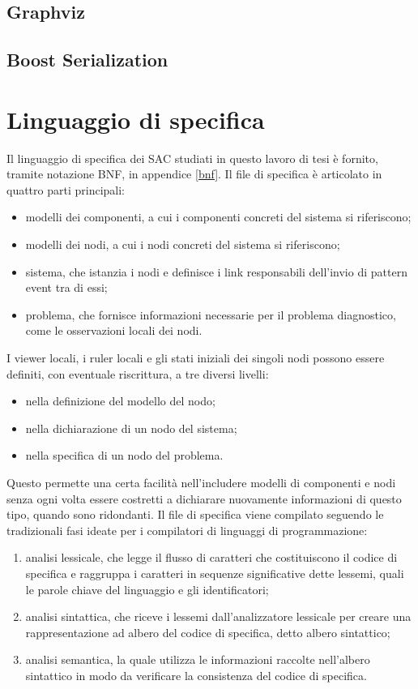\subsection{Graphviz}

\subsection{Boost Serialization}




\section{Linguaggio di specifica}
Il linguaggio di specifica dei SAC studiati in questo lavoro di tesi è fornito, tramite notazione BNF, in appendice \ref{bnf}. 
Il file di specifica è articolato in quattro parti principali:
\begin{itemize}
\item modelli dei componenti, a cui i componenti concreti del sistema si riferiscono;
\item modelli dei nodi, a cui i nodi concreti del sistema si riferiscono;
\item sistema, che istanzia i nodi e definisce i link responsabili dell'invio di pattern event tra di essi;
\item problema, che fornisce informazioni necessarie per il problema diagnostico, come le osservazioni locali dei nodi.
\end{itemize}
I viewer locali, i ruler locali e gli stati iniziali dei singoli nodi possono essere definiti, con eventuale riscrittura, a tre diversi livelli:
\begin{itemize}
\item nella definizione del modello del nodo;
\item nella dichiarazione di un nodo del sistema;
\item nella specifica di un nodo del problema.
\end{itemize}
Questo permette una certa facilità nell'includere modelli di componenti e nodi senza ogni volta essere costretti a dichiarare nuovamente informazioni di questo tipo, quando sono ridondanti.
Il file di specifica viene compilato seguendo le tradizionali fasi ideate per i compilatori di linguaggi di programmazione:
\begin{enumerate}
\item analisi lessicale, che legge il flusso di caratteri che costituiscono il codice di specifica e raggruppa i caratteri in sequenze significative dette lessemi, quali le parole chiave del linguaggio e gli identificatori;
\item analisi sintattica, che riceve i lessemi dall'analizzatore lessicale per creare una rappresentazione ad albero del codice di specifica, detto albero sintattico;
\item analisi semantica, la quale utilizza le informazioni raccolte nell'albero sintattico in modo da verificare la consistenza del codice di specifica.
\end{enumerate}
